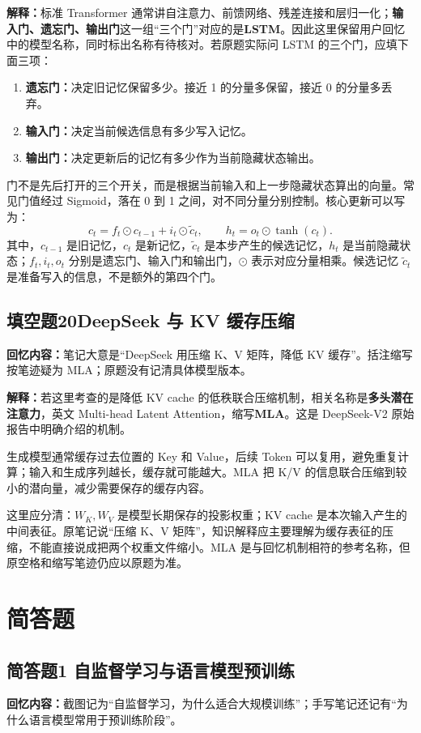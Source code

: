 \documentclass[UTF8,a4paper,zihao=-4,fontset=windows]{ctexart}
\newcommand{\recalled}[1]{\Needspace{8\baselineskip}\subsection*{#1}}
\begin{document}
\textbf{解释：}标准 Transformer 通常讲自注意力、前馈网络、残差连接和层归一化；\textbf{输入门、遗忘门、输出门}这一组“三个门”对应的是\textbf{LSTM}。因此这里保留用户回忆中的模型名称，同时标出名称有待核对。若原题实际问 LSTM 的三个门，应填下面三项：
\begin{enumerate}
\item \textbf{遗忘门：}决定旧记忆保留多少。接近 1 的分量多保留，接近 0 的分量多丢弃。
\item \textbf{输入门：}决定当前候选信息有多少写入记忆。
\item \textbf{输出门：}决定更新后的记忆有多少作为当前隐藏状态输出。
\end{enumerate}
门不是先后打开的三个开关，而是根据当前输入和上一步隐藏状态算出的向量。常见门值经过 Sigmoid，落在 0 到 1 之间，对不同分量分别控制。核心更新可以写为：
\[
c_t=f_t\odot c_{t-1}+i_t\odot\widetilde c_t,\qquad
h_t=o_t\odot\tanh(c_t).
\]
其中，$c_{t-1}$ 是旧记忆，$c_t$ 是新记忆，$\widetilde c_t$ 是本步产生的候选记忆，$h_t$ 是当前隐藏状态；$f_t,i_t,o_t$ 分别是遗忘门、输入门和输出门，$\odot$ 表示对应分量相乘。候选记忆 $\widetilde c_t$ 是准备写入的信息，不是额外的第四个门。

\recalled{填空题20\quad DeepSeek 与 KV 缓存压缩}
\textbf{回忆内容：}笔记大意是“DeepSeek 用\underline{\hspace{1.5cm}}压缩 K、V 矩阵，降低 KV 缓存”。括注缩写按笔迹疑为 MLA；原题没有记清具体模型版本。

\textbf{解释：}若这里考查的是降低 KV cache 的低秩联合压缩机制，相关名称是\textbf{多头潜在注意力}，英文 Multi-head Latent Attention，缩写\textbf{MLA}。这是 DeepSeek-V2 原始报告中明确介绍的机制。

生成模型通常缓存过去位置的 Key 和 Value，后续 Token 可以复用，避免重复计算；输入和生成序列越长，缓存就可能越大。MLA 把 K/V 的信息联合压缩到较小的潜向量，减少需要保存的缓存内容。

这里应分清：$W_K,W_V$ 是模型长期保存的投影权重；KV cache 是本次输入产生的中间表征。原笔记说“压缩 K、V 矩阵”，知识解释应主要理解为缓存表征的压缩，不能直接说成把两个权重文件缩小。MLA 是与回忆机制相符的参考名称，但原空格和缩写笔迹仍应以原题为准。

\section{简答题}

\recalled{简答题1 自监督学习与语言模型预训练}
\textbf{回忆内容：}截图记为“自监督学习，为什么适合大规模训练”；手写笔记还记有“为什么语言模型常用于预训练阶段”。
\end{document}
